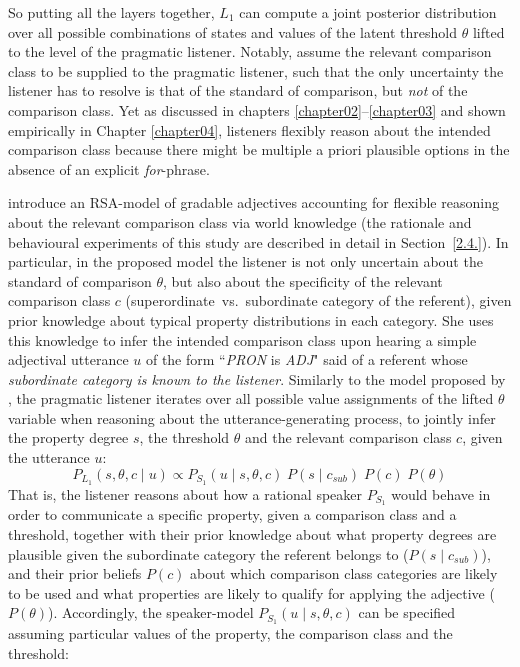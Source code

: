 So putting all the layers together, $L_1$ can compute a joint posterior distribution over all possible combinations of states and values of the latent threshold $\theta$ lifted to the level of the pragmatic listener. Notably, \textcite{lassiter2013context} assume the relevant comparison class to be supplied to the pragmatic listener, such that the only uncertainty the listener has to resolve is that of the standard of comparison, but \emph{not} of the comparison class. Yet as discussed in chapters \ref{chapter02}--\ref{chapter03} and shown empirically in Chapter \ref{chapter04}, listeners flexibly reason about the intended comparison class because there might be multiple a priori plausible options in the absence of an explicit \emph{for}-phrase.

\textcite{tessler2017warm} introduce an RSA-model of gradable adjectives accounting for flexible reasoning about the relevant comparison class via world knowledge (the rationale and behavioural experiments of this study are described in detail in Section~\ref{2.4.}). In particular, in the proposed model the listener is not only uncertain about the standard of comparison $\theta$, but also about the specificity of the relevant comparison class $c$ (superordinate~vs.~subordinate category of the referent), given prior knowledge about typical property distributions in each category. %
She uses this knowledge to infer the intended comparison class upon hearing a simple adjectival utterance $u$ of the form ``\emph{PRON} is \emph{ADJ}" said of a referent whose \emph{subordinate category is known to the listener}.
Similarly to the model proposed by \textcite{lassiter2013context}, the pragmatic listener iterates over all possible value assignments of the lifted $\theta$ variable when reasoning about the utterance-generating process, to jointly infer the property degree $s$, the threshold $\theta$ and the relevant comparison class $c$, given the utterance $u$:
\begin{equation}
P_{L_1}(s, \theta, c \mid u) \propto P_{S_1} ( u \mid s, \theta, c) \; P(s \mid c_{sub}) \; P(c) \; P(\theta)
\end{equation} 
That is, the listener reasons about how a rational speaker $P_{S_1}$ would behave in order to communicate a specific property, given a comparison class and a threshold, together with their prior knowledge about what property degrees are plausible given the subordinate category the referent belongs to ($P(s \mid c _{sub})$), and their prior beliefs $P(c)$ about which comparison class categories are likely to be used and what properties are likely to qualify for applying the adjective ($P(\theta)$). Accordingly, the speaker-model $P_{S_1}( u \mid s, \theta, c)$ can be specified assuming particular values of the property, the comparison class and the threshold:
